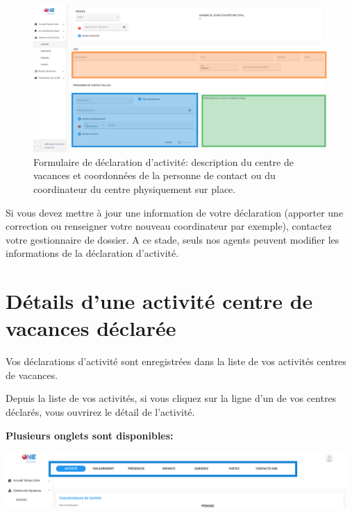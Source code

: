 \begin{figure}[h]
    \centering
    \includegraphics[width=12cm]{Images/cdv/da-lieu.png}
    \caption{Formulaire de déclaration d'activité: description du centre de vacances et coordonnées de la personne de contact ou du coordinateur du centre physiquement sur place.}
    \label{fig:cdv_da2}
\end{figure}


Si vous devez mettre à jour une information de votre déclaration (apporter une correction ou renseigner votre nouveau coordinateur par exemple), contactez votre gestionnaire de dossier. A ce stade, seuls nos agents peuvent modifier les informations de la déclaration d'activité. 
\section{Détails d'une activité centre de vacances déclarée}

Vos déclarations d'activité sont enregistrées dans la liste de vos activités centres de vacances. 

Depuis la liste de vos activités, si vous cliquez sur la ligne d'un de vos centres déclarés, vous ouvrirez le détail de l'activité.

\textbf{Plusieurs onglets sont disponibles:} 

\centerline{\includegraphics[width=13cm]{Images/cdv/cdv-onglets.png}}

